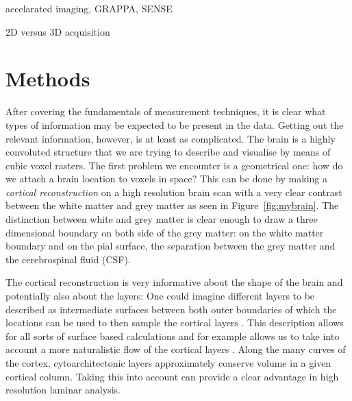 accelarated imaging, GRAPPA, SENSE

2D versus 3D acquisition


\section*{Methods}
After covering the fundamentals of measurement techniques, it is clear what types of information may be expected to be present in the data. Getting out the relevant information, however, is at least as complicated. The brain is a highly convoluted structure that we are trying to describe and visualise by means of cubic voxel rasters. The first problem we encounter is a geometrical one: how do we attach a brain location to voxels in space? This can be done by making a \emph{cortical reconstruction} on a high resolution brain scan \cite{Dale1999,Bazin2012} with a very clear contrast between the white matter and grey matter as seen in Figure~\ref{fig:mybrain}. The distinction between white and grey matter is clear enough to draw a three dimensional boundary on both side of the grey matter: on the white matter boundary and on the pial surface, the separation between the grey matter and the cerebrospinal fluid (CSF).


The cortical reconstruction is very informative about the shape of the brain and potentially also about the layers: One could imagine different layers to be described as intermediate surfaces between both outer boundaries of which the locations can be used to then sample the cortical layers \cite{Koopmans2011,Polimeni2010,DeMartino2013}. This description allows for all sorts of surface based calculations \cite{Fischl2000,Bazin2012} and for example allows us to take into account a more naturalistic flow of the cortical layers \cite{Bok1929,Waehnert2014}. Along the many curves of the cortex, cytoarchitectonic layers approximately conserve volume in a given cortical column. Taking this into account can provide a clear advantage in high resolution laminar analysis.

